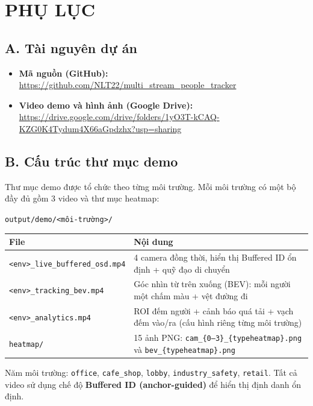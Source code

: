 \section*{PHỤ LỤC}

\subsection*{A. Tài nguyên dự án}

\begin{itemize}
    \item \textbf{Mã nguồn (GitHub):}
    \url{https://github.com/NLT22/multi\_stream\_people\_tracker}

    \item \textbf{Video demo và hình ảnh (Google Drive):}
    \url{https://drive.google.com/drive/folders/1yO3T-kCAQ-KZG0K4Tydum4X66aGpdzhx?usp=sharing}
\end{itemize}

\subsection*{B. Cấu trúc thư mục demo}

Thư mục demo được tổ chức theo từng môi trường. Mỗi môi trường có một bộ đầy đủ gồm 3 video và thư mục heatmap:

\begin{center}
\texttt{output/demo/<môi-trường>/}
\end{center}

\begin{table}[H]
\centering
\begin{tabular}{|l|p{10cm}|}
\hline
\bfseries File & \bfseries Nội dung \\
\hline
\texttt{<env>\_live\_buffered\_osd.mp4} & 4 camera đồng thời, hiển thị Buffered ID ổn định + quỹ đạo di chuyển \\
\texttt{<env>\_tracking\_bev.mp4}       & Góc nhìn từ trên xuống (BEV): mỗi người một chấm màu + vệt đường đi \\
\texttt{<env>\_analytics.mp4}           & ROI đếm người + cảnh báo quá tải + vạch đếm vào/ra (cấu hình riêng từng môi trường) \\
\texttt{heatmap/}                       & 15 ảnh PNG: \texttt{cam\_\{0--3\}\_\{typeheatmap\}.png} và \texttt{bev\_\{typeheatmap\}.png} \\
\hline
\end{tabular}
\end{table}

Năm môi trường: \texttt{office}, \texttt{cafe\_shop}, \texttt{lobby}, \texttt{industry\_safety}, \texttt{retail}. Tất cả video sử dụng chế độ \textbf{Buffered ID (anchor-guided)} để hiển thị định danh ổn định.
